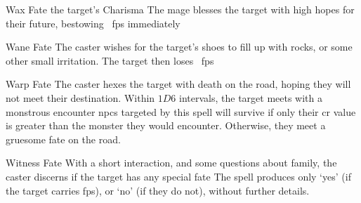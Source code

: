   {}%
  {Wax}%
  {Fate}%
  {the target's Charisma}%
  {The mage blesses the target with high hopes for their future, bestowing \showDam~\glspl{fp} immediately}%
  {}

  {}%
  {Wane}%
  {Fate}%
  {}%
  {The caster wishes for the target's shoes to fill up with rocks, or some other small irritation.
    The target then loses \showDam~\glspl{fp}}%
  {}


  {}%
  {Warp}%
  {Fate}%
  {}%
  {The caster hexes the target with death on the road, hoping they will not meet their destination.
    Within $1D6$ \glspl{interval}, the target meets with a monstrous encounter}%
  {
    \Glspl{npc} targeted by this spell will survive if only their \gls{cr} value is greater than the monster they would encounter.
    Otherwise, they meet a gruesome fate on the road.
  }

  {}%
  {Witness}%
  {Fate}%
  {}%
  {With a short interaction, and some questions about family, the caster discerns if the target has any special fate}%
  {The spell produces only `yes' (if the target carries \glspl{fp}), or `no' (if they do not), without further details.}

